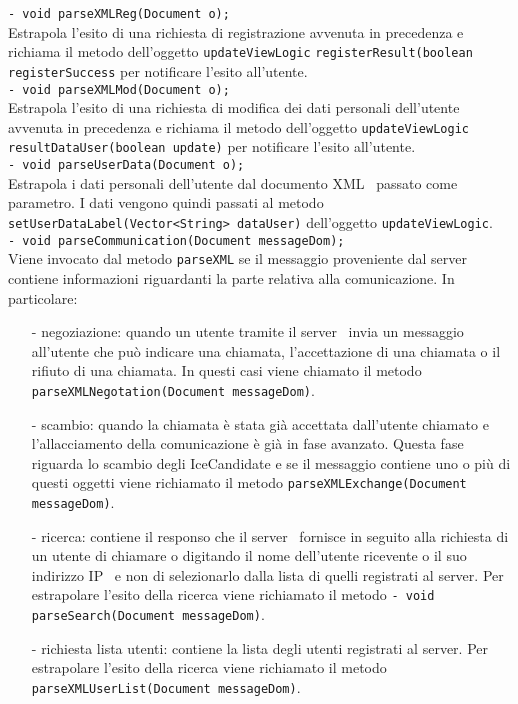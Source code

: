 {{\begin{sloppypar}
{{\begin{itemize}
{					\texttt{- void parseXMLReg(Document o);}	\\
					Estrapola l'esito di una richiesta di registrazione avvenuta in precedenza e richiama il metodo dell'oggetto \texttt{updateViewLogic} \texttt{registerResult(boolean registerSuccess} per notificare l'esito all'utente.\\

					\texttt{- void parseXMLMod(Document o);}\\
					Estrapola l'esito di una richiesta di modifica dei dati personali dell'utente avvenuta in precedenza e richiama il metodo dell'oggetto \texttt{updateViewLogic} \texttt{resultDataUser(boolean update)} per notificare l'esito all'utente.\\

					\texttt{- void parseUserData(Document o);}\\
					Estrapola i dati personali dell'utente dal documento XML\g~ passato come parametro. I dati vengono quindi passati al metodo \texttt{setUserDataLabel(Vector<String> dataUser)} dell'oggetto \texttt{updateViewLogic}.\\

					\texttt{- void parseCommunication(Document messageDom);}\\
					Viene invocato dal metodo \texttt{parseXML} se il messaggio proveniente dal server\g~ contiene informazioni riguardanti la parte relativa alla comunicazione. In particolare:
					\begin{itemize}
						\item[-] negoziazione: quando un utente tramite il server\g~ invia un messaggio all'utente che può indicare una chiamata, l'accettazione di una chiamata o il rifiuto di una chiamata. In questi casi viene chiamato il metodo \texttt{parseXMLNegotation(Document messageDom)}.
						\item[-] scambio: quando la chiamata è stata già accettata dall'utente chiamato e l'allacciamento della comunicazione è già in fase avanzato. Questa fase riguarda lo scambio degli IceCandidate e se il messaggio contiene uno o più di questi oggetti viene richiamato il metodo \texttt{parseXMLExchange(Document messageDom)}.
						\item[-] ricerca: contiene il responso che il server\g~ fornisce in seguito alla richiesta di un utente di chiamare o digitando il nome dell'utente ricevente o il suo indirizzo IP\g~ e non di selezionarlo dalla lista di quelli registrati al server\g. Per estrapolare l'esito della ricerca viene richiamato il metodo \texttt{- void parseSearch(Document messageDom)}. 
						\item[-] richiesta lista utenti: contiene la lista degli utenti registrati al server\g. Per estrapolare l'esito della ricerca viene richiamato il metodo \texttt{parseXMLUserList(Document messageDom)}.\\
					\end{itemize}

}
\end{itemize}}}
\end{sloppypar}}}
